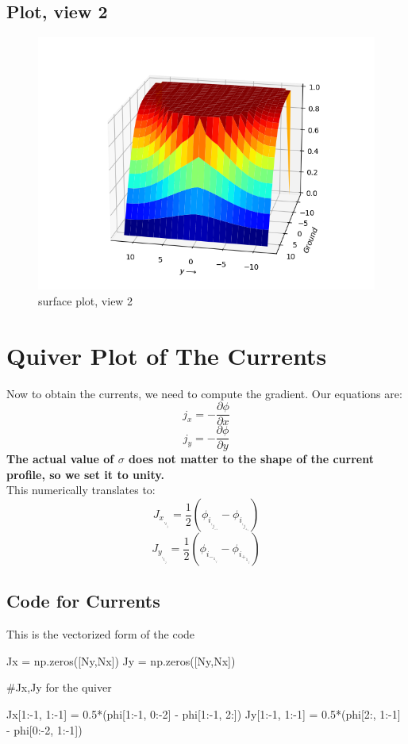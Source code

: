 \documentclass[11pt]{article}
\begin{document}
\subsection{Plot, view 2}
\begin{figure}[H]
    \centering
    \includegraphics[scale = 1]{Figure_9.png}
    \caption{surface plot, view 2}
\end{figure}

\section{Quiver Plot of The Currents}

Now to obtain the currents, we need to compute the gradient. Our equations are:
\begin{equation}
    j_x = -\frac{\partial \phi}{\partial x}
\end{equation}
\begin{equation}
    j_y = -\frac{\partial \phi}{\partial y}
\end{equation}
\textbf{The actual value of $\sigma$ does not matter to the shape of the current profile, so we set it to unity.}\\
This numerically translates to:
\begin{equation}
    J_x_,_i_,_j = \frac{1}{2}(\phi_i_,_j_-_1 - \phi_i_,_j_+_1)
\end{equation}
\begin{equation}
    J_y_,_i_,_j = \frac{1}{2}(\phi_i_-_1_,_j - \phi_i_+_1_,_j)
\end{equation}

\subsection{Code for Currents}
This is the vectorized form of the code
\begin{python}
Jx = np.zeros([Ny,Nx])
Jy = np.zeros([Ny,Nx])

#Jx,Jy for the quiver

Jx[1:-1, 1:-1] = 0.5*(phi[1:-1, 0:-2] - phi[1:-1, 2:])
Jy[1:-1, 1:-1] = 0.5*(phi[2:, 1:-1] - phi[0:-2, 1:-1])
\end{python}
\end{document}
